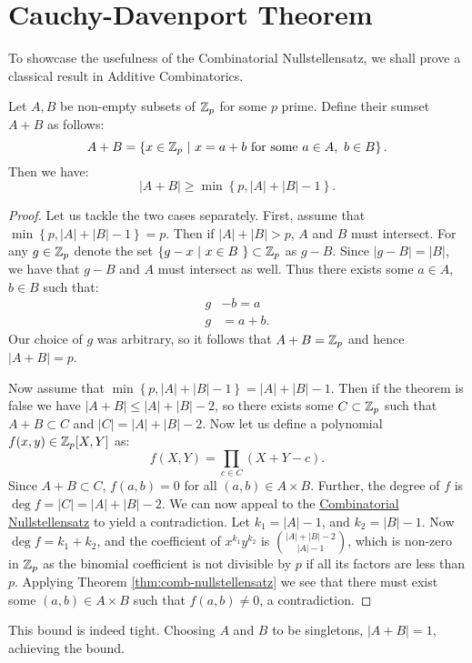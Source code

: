 \section{Cauchy-Davenport Theorem}
To showcase the usefulness of the Combinatorial Nullstellensatz, we shall prove a classical result in Additive Combinatorics. 
\begin{theorem} 
    Let $A,B$ be non-empty subsets of $\mathbb Z_p$ for some $p$ prime. Define their sumset $A+B$ as follows:
    \[
    A + B = 
    \left\{ x \in \mathbb Z_p\ | \ x = a+b \text{  for some } a\in A, \ b \in B \right\}.
    \]
    Then we have:
    \[
    |A+B| \geq  \min \left\{p, |A| + |B| -1 \right\}.
    \]
\end{theorem}

\begin{proof}
    Let us tackle the two cases separately. First, assume that $\min \left\{p, |A| + |B| -1 \right\} = p$.
    Then if $|A| + |B| > p$, $A$ and $B$ must intersect. 
    For any $g \in \mathbb Z_p$ denote the set  $\left\{ g - x  \ | \ x \in B \  \right\} \subset \mathbb Z_p$ as $g-B$. Since $|g-B| = |B|$, we have that 
    $g-B$ and $A$ must intersect as well. Thus there exists some $a \in A$, $b \in B$ such that: 
    \begin{align*}
        g& -b = a \\
        g& = a+b.
    \end{align*}
    Our choice of $g$ was arbitrary, so it follows that $A+B = \mathbb Z_p$ and hence $|A+B| = p$.

    Now assume that $\min \left\{p, |A| + |B| -1 \right\} = |A| + |B| -1$. Then if the theorem is false we have $|A+B| \leq |A| + |B| -2$, so there exists some $C \subset \mathbb Z_p$ such that 
    $A+B \subset C$ and $|C| =  |A| + |B| -2$. Now let us define a polynomial $f(x,y) \in \mathbb Z_p [X,Y]$ as:
    \[
        f(X,Y) = \prod_{c \in C} (X+Y -c).
    \]
    Since $A+B \subset C$, $f(a,b) =0$ for all $(a,b) \in A\times B$. Further, the degree of $f$ is $\deg f = |C| = |A| + |B| -2$. 
    We can now appeal to the \hyperref[thm:comb-nullstellensatz]{Combinatorial Nullstellensatz} to yield a contradiction. Let $k_1 = |A| -1$, and $k_2 = |B|-1$. 
    Now $\deg f = k_1 + k_2$, and the coefficient of $x^{k_1}y^{k_2}$ is
    ${|A|+|B| - 2} \choose {|A|- 1}$, which is non-zero in $\mathbb Z_p$ as the binomial coefficient is not divisible by $p$ if all its factors are less than $p$. Applying Theorem \ref{thm:comb-nullstellensatz} we see that there 
    must exist some $(a,b) \in A \times B$ such that $f(a,b) \neq 0$, a contradiction.
\end{proof}
\begin{remark}
    This bound is indeed tight. Choosing $A$ and $B$ to be singletons, $|A+B| =1$, achieving the bound.
\end{remark}